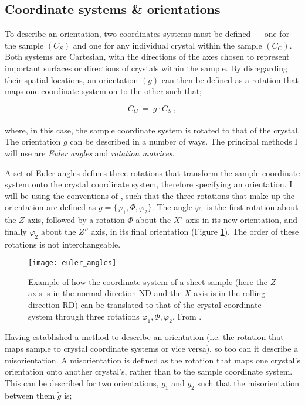 \documentclass[a4paper,12pt,twoside]{report}
\numberwithin{equation}{chapter}
\begin{document}
\subsection{Coordinate systems \& orientations} \label{subsec:coordinates}
To describe an orientation, two coordinates systems must be defined --- one for the sample $(C_S)$ and one for any individual crystal within the sample $(C_C)$. Both systems are Cartesian, with the directions of the axes chosen to represent important surfaces or directions of crystals within the sample. By disregarding their spatial locations, an orientation $(g)$ can then be defined as a rotation that maps one coordinate system on to the other such that;



\begin{equation}
C_C\ =\ g \cdot C_S\ ,
\end{equation}  
\\
where, in this case, the sample coordinate system is rotated to that of the crystal. The orientation $g$ can be described in a number of ways. The principal methods I will use are \emph{Euler angles} and \emph{rotation matrices}.


A set of Euler angles defines three rotations that transform the sample coordinate system onto the crystal coordinate system, therefore specifying an orientation. I will be using the conventions of \cite{bunge1982texture}, such that the three rotations that make up the orientation are defined as $g = \{\varphi_1,\Phi,\varphi_2\}$. The angle $\varphi_1$ is the first rotation about the $Z$ axis, followed by a rotation $\Phi$ about the $X'$ axis in its new orientation, and finally $\varphi_2$ about the $Z''$ axis, in its final orientation (Figure \ref{fig:euler_angles}). The order of these rotations is not interchangeable.




\begin{figure}[h!]
  \centering
    \texttt{[image: euler\_angles]}
  \caption[Euler angle description]{Example of how the coordinate system of a sheet sample (here the $Z$ axis is in the normal direction ND and the $X$ axis is in the rolling direction RD) can be translated to that of the crystal coordinate system through three rotations $\varphi_1,\Phi,\varphi_2$. From \cite{Randle2000}.}
  \label{fig:euler_angles}
\end{figure}

Having established a method to describe an orientation (i.e. the rotation that maps sample to crystal coordinate systems or vice versa), so too can it describe a misorientation. A misorientation is defined as the rotation that maps one crystal's orientation onto another crystal's, rather than to the sample coordinate system. This can be described for two orientations, $g_1$ and $g_2$ such that the misorientation between them $\tilde{g}$ is;
\end{document}
